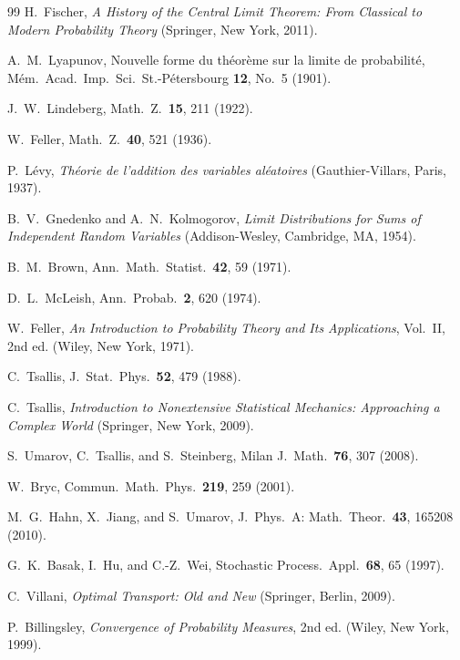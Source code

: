 \documentclass[aip,jmp,preprint,onecolumn,floatfix,superscriptaddress,nofootinbib,11pt]{revtex4-2}
\theoremstyle{plain}
\theoremstyle{remark}
\numberwithin{equation}{section}
\begin{document}
\clearpage
\begin{thebibliography}{99}
 H.~Fischer, \emph{A History of the Central Limit Theorem: From Classical to Modern Probability Theory} (Springer, New York, 2011).
 
 A.~M.~Lyapunov, Nouvelle forme du th\'eor\`eme sur la limite de probabilit\'e, M\'em.\ Acad.\ Imp.\ Sci.\ St.-P\'etersbourg \textbf{12}, No.~5 (1901).
 
 J.~W.~Lindeberg, Math.\ Z.\ \textbf{15}, 211 (1922).
 
 W.~Feller, Math.\ Z.\ \textbf{40}, 521 (1936).
 
 P.~L\'evy, \emph{Th\'eorie de l'addition des variables al\'eatoires} (Gauthier-Villars, Paris, 1937).
 
 B.~V.~Gnedenko and A.~N.~Kolmogorov, \emph{Limit Distributions for Sums of Independent Random Variables} (Addison-Wesley, Cambridge, MA, 1954).
 
 B.~M.~Brown, Ann.\ Math.\ Statist.\ \textbf{42}, 59 (1971).
 
 D.~L.~McLeish, Ann.\ Probab.\ \textbf{2}, 620 (1974).
 
 W.~Feller, \emph{An Introduction to Probability Theory and Its Applications}, Vol.~II, 2nd ed. (Wiley, New York, 1971).
 
 C.~Tsallis, J.\ Stat.\ Phys.\ \textbf{52}, 479 (1988).
 
 C.~Tsallis, \emph{Introduction to Nonextensive Statistical Mechanics: Approaching a Complex World} (Springer, New York, 2009).
 
 S.~Umarov, C.~Tsallis, and S.~Steinberg, Milan J.\ Math.\ \textbf{76}, 307 (2008).
 
 W.~Bryc, Commun.\ Math.\ Phys.\ \textbf{219}, 259 (2001).
 
 M.~G.~Hahn, X.~Jiang, and S.~Umarov, J.\ Phys.\ A: Math.\ Theor.\ \textbf{43}, 165208 (2010).
 
 G.~K.~Basak, I.~Hu, and C.-Z.~Wei, Stochastic Process.\ Appl.\ \textbf{68}, 65 (1997).
 
 C.~Villani, \emph{Optimal Transport: Old and New} (Springer, Berlin, 2009).
 
 P.~Billingsley, \emph{Convergence of Probability Measures}, 2nd ed. (Wiley, New York, 1999).
 
\end{thebibliography}
 
\end{document}
